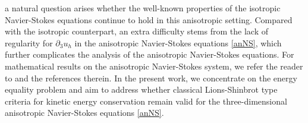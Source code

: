 \documentclass[11pt]{article}
\theoremstyle{plain}\newtheorem{definition}{Definition}[section]
\theoremstyle{definition}\newtheorem{theorem}{Theorem}[section]
\theoremstyle{plain}\newtheorem{lemma}[theorem]{Lemma}
\theoremstyle{plain}\newtheorem{coro}[theorem]{Corollary}
\theoremstyle{plain}\newtheorem{prop}[theorem]{Proposition}
\theoremstyle{remark}\newtheorem{remark}{Remark}[section]
\numberwithin{equation}{section}
\begin{document}
 a natural  question   arises whether the well-known properties of the isotropic Navier-Stokes equations continue to hold in this anisotropic setting. Compared with the isotropic counterpart, an extra difficulty stems from the lack of regularity for \(\partial_3 u_h\) in the anisotropic Navier-Stokes equations \eqref{anNS}, which further complicates the analysis of the anisotropic Navier-Stokes equations. For mathematical results on the anisotropic Navier-Stokes system, we refer the reader to \cite{[CDGG],[CW],[ZW],[CG],[YJW], [BFWZ],[CW1],[ZZ],[JTW],[F],[XZ]} and the references therein. In the present work, we concentrate on the energy equality problem and aim to address whether classical Lions-Shinbrot type criteria    for kinetic energy conservation  remain valid for the three-dimensional anisotropic Navier-Stokes equations \eqref{anNS}.
\end{document}
